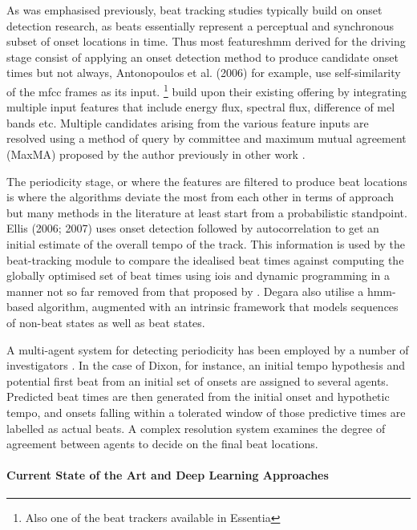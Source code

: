 {As was emphasised previously, beat tracking studies typically build on onset detection research, as beats essentially represent a perceptual and synchronous subset of onset locations in time. Thus most features\acrshort{hmm} derived for the driving stage consist of applying an onset detection method to produce candidate onset times \citep{Brossier2006, Dixon2006, Ellis2007a, Degara2012, Zapata2014} but not always,   Antonopoulos et al. (2006) for example, use self-similarity of the \acrshort{mfcc} frames as its input. \cite{Degara2012}\footnote{Also one of the beat trackers available in Essentia} build upon their existing offering by integrating multiple input features that include energy flux, spectral flux, difference of mel bands etc. Multiple candidates arising from the various feature inputs are resolved using a method of query by committee and maximum mutual agreement (MaxMA) proposed by the author previously in other work \citep{Zapata2012, Zapata2014}.

The periodicity stage, or where the features are filtered to produce beat locations is where the algorithms deviate the most from each other in terms of approach but many methods in the literature at least start from a probabilistic standpoint. Ellis (2006; 2007) uses onset detection followed by autocorrelation to get an initial estimate of the overall tempo of the track. This information is used by the beat-tracking module to compare the idealised beat times against computing the globally optimised set of beat times using \acrshort{ioi}s and dynamic programming in a manner not so far removed from that proposed by \cite{Alonso2007}. Degara also utilise a \acrshort{hmm}-based algorithm, augmented with an intrinsic framework that models sequences of non-beat states as well as beat states.

A multi-agent system for detecting periodicity has been employed by a number of investigators \citep{Goto2001a, Dixon2007, Oliveira2012}. In the case of Dixon, for instance, an initial tempo hypothesis and potential first beat from an initial set of onsets are assigned to several agents. Predicted beat times are then generated from the initial onset and hypothetic tempo, and onsets falling within a tolerated window of those predictive times are labelled as actual beats. A complex resolution system examines the degree of agreement between agents to decide on the final beat locations.

\paragraph{Current State of the Art and Deep Learning Approaches}

}
